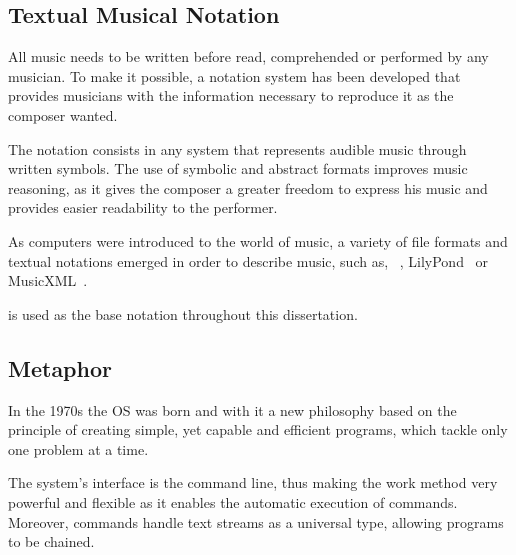 \subsection*{Textual Musical Notation}

All music needs to be written before read, comprehended or performed by any musician. To make it
possible, a notation system has been developed that provides musicians with the information
necessary to reproduce it as the composer wanted.

The notation consists in any system that represents audible music through written symbols. The use
of symbolic and abstract formats improves music reasoning, as it gives the composer a greater
freedom to express his music and provides easier readability to the performer.

As computers were introduced to the world of music, a variety of file formats and textual notations
emerged in order to describe music, such as, \abc{}~\cite{abcnotation:Online},
LilyPond~\cite{lilypond:Online} or MusicXML~\cite{musicxml:Online}.

\abc{} is used as the base notation throughout this dissertation.

\subsection*{\unix{} Metaphor}

In the 1970s the \ac{OS} \unix{} was born and with it a new philosophy\cite{raymond2004art} based on
the principle of creating simple, yet capable and efficient programs, which tackle only one problem
at a time.

The system's interface is the command line, thus making the work method very powerful and flexible
as it enables the automatic execution of commands. Moreover, commands handle text streams as a
universal type, allowing programs to be chained.



